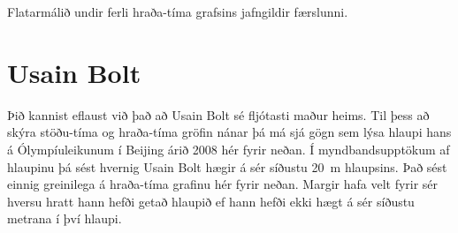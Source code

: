 \ifdefined \wholebook \else\documentclass[oneside]{book}\usepackage{EdlBook}\graphicspath{{figures/}}
\begin{document}
\begin{tcolorbox}
\begin{theorem} \label{law:flatarmal}
Flatarmálið undir ferli hraða-tíma grafsins jafngildir færslunni. 
\end{theorem}
\end{tcolorbox}

\newpage

\section{Usain Bolt}

Þið kannist eflaust við það að Usain Bolt sé fljótasti maður heims. Til þess að skýra stöðu-tíma og hraða-tíma gröfin nánar þá má sjá gögn sem lýsa hlaupi hans á Ólympíuleikunum í Beijing árið 2008 hér fyrir neðan. Í myndbandsupptökum af hlaupinu þá sést hvernig Usain Bolt hægir á sér síðustu \SI{20}{m} hlaupsins. Það sést einnig greinilega á hraða-tíma grafinu hér fyrir neðan. Margir hafa velt fyrir sér hversu hratt hann hefði getað hlaupið ef hann hefði ekki hægt á sér síðustu metrana í því hlaupi.

\end{document}
